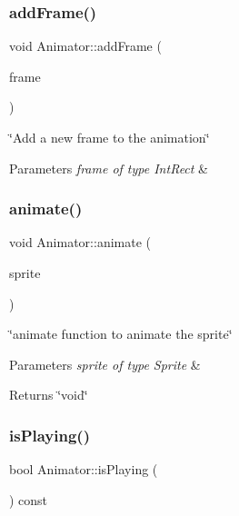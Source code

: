 \subsubsection{\texorpdfstring{add\+Frame()}{addFrame()}}
{\footnotesize\ttfamily void Animator\+::add\+Frame (\begin{DoxyParamCaption}\item[{sf\+::\+Int\+Rect}]{frame }\end{DoxyParamCaption})}



\char`\"{}\+Add a new frame to the animation\char`\"{} 


\begin{DoxyParams}{Parameters}
{\em frame of type Int\+Rect} & \\
\hline
\end{DoxyParams}
\mbox{\label{classAnimator_a04281600d159dbc1556d3856b69cef74}} 
\subsubsection{\texorpdfstring{animate()}{animate()}}
{\footnotesize\ttfamily void Animator\+::animate (\begin{DoxyParamCaption}\item[{sf\+::\+Sprite \&}]{sprite }\end{DoxyParamCaption})}



\char`\"{}animate function to animate the sprite\char`\"{} 


\begin{DoxyParams}{Parameters}
{\em sprite of type Sprite} & \\
\hline
\end{DoxyParams}
\begin{DoxyReturn}{Returns}
\char`\"{}void\char`\"{} 
\end{DoxyReturn}
\mbox{\label{classAnimator_af652cfa1671a9a8155f85b2b33f65a17}} 
\subsubsection{\texorpdfstring{is\+Playing()}{isPlaying()}}
{\footnotesize\ttfamily bool Animator\+::is\+Playing (\begin{DoxyParamCaption}{ }\end{DoxyParamCaption}) const}



